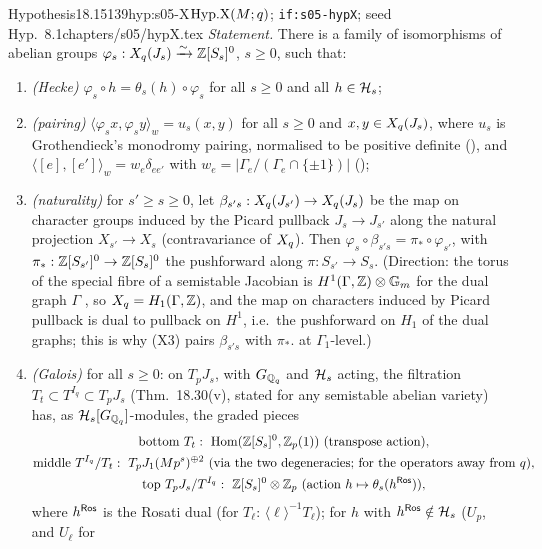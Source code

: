 \begin{quoted}{Hypothesis}{18.15}{139}{hyp:s05-X}{$\mathrm{Hyp.X}(M;q)$; \texttt{if:s05-hypX}; seed Hyp.~8.1}{chapters/s05/hypX.tex}
\emph{Statement.} There is a family of isomorphisms of abelian groups $\varphi_s:X_q(J_s)\xrightarrow{\sim}\mathbb{Z}[S_s]^0$, $s\ge0$, such that:
\begin{enumerate}[label=(X\arabic*)]
\item \emph{(Hecke)} $\varphi_s\circ h=\theta_s(h)\circ\varphi_s$ for all $s\ge0$ and all $h\in\mathcal{H}_s$;
\item \emph{(pairing)} $\langle\varphi_sx,\varphi_sy\rangle_w=u_s(x,y)$ for all $s\ge0$ and $x,y\in X_q(J_s)$, where $u_s$ is Grothendieck's
  monodromy pairing, normalised to be positive definite (), and $\langle[e],[e']\rangle_w=w_e\delta_{ee'}$ with
  $w_e=|\Gamma_e/(\Gamma_e\cap\{\pm1\})|$ ();
\item \emph{(naturality)} for $s'\ge s\ge0$, let $\beta_{s's}:X_q(J_{s'})\to X_q(J_s)$ be the map on character groups induced by the
  Picard pullback $J_s\to J_{s'}$ along the natural projection $X_{s'}\to X_s$ (contravariance of $X_q$). Then
  $\varphi_s\circ\beta_{s's}=\pi_*\circ\varphi_{s'}$, with $\pi_*:\mathbb{Z}[S_{s'}]^0\to\mathbb{Z}[S_s]^0$ the pushforward along $\pi:S_{s'}\to S_s$. (Direction: the torus of the special fibre of a semistable Jacobian is
  $H^1(\Gamma,\mathbb{Z})\otimes\mathbb G_m$ for the dual graph $\Gamma$ \cite[{Appendix, \S3,
  p.~183, for $N=p$}]{Mz}, so $X_q=H_1(\Gamma,\mathbb{Z})$, and the map on characters induced by Picard pullback is dual to pullback on $H^1$, i.e.\
  the pushforward on $H_1$ of the dual graphs; this is why (X3) pairs $\beta_{s's}$ with $\pi_*$. \stsketch{} at $\Gamma_1$-level.)
\item \emph{(Galois)} for all $s\ge0$: on $T_pJ_s$, with $G_{\mathbb{Q}_q}$ and $\mathcal{H}_s$ acting, the filtration $T_t\subset T^{I_q}\subset T_pJ_s$
  (Thm.~18.30(v), stated for any semistable abelian variety) has, as $\mathcal{H}_s[G_{\mathbb{Q}_q}]$-modules, the graded pieces
  \[\begin{gathered}\text{bottom }T_t:\ \Hom(\Z[S_s]^0,\Zp(1))\ (\text{transpose action}),\\
  \text{middle }T^{I_q}/T_t:\ T_pJ_1(Mp^s)^{\oplus2}\ (\text{via the two degeneracies; for the operators away from $q$}),\\
  \text{top }T_pJ_s/T^{I_q}:\ \Z[S_s]^0\otimes\Zp\ (\text{action }h\mapsto\theta_s(h^\Ros)),\end{gathered}\]
  where $h^{\mathsf{Ros}}$ is the Rosati dual (for $T_\ell$: $\langle\ell\rangle^{-1}T_\ell$); for $h$ with $h^{\mathsf{Ros}}\notin\mathcal{H}_s$ ($U_p$, and $U_\ell$ for

\end{enumerate}
\end{quoted}
